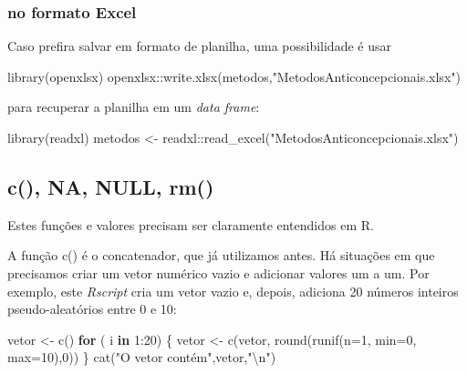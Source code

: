 \documentclass[
]{article}
\newenvironment{Shaded}{\begin{snugshade}}{\end{snugshade}}
\newcommand{\AttributeTok}[1]{\textcolor[rgb]{0.77,0.63,0.00}{#1}}
\newcommand{\ControlFlowTok}[1]{\textcolor[rgb]{0.13,0.29,0.53}{\textbf{#1}}}
\newcommand{\DecValTok}[1]{\textcolor[rgb]{0.00,0.00,0.81}{#1}}
\newcommand{\FunctionTok}[1]{\textcolor[rgb]{0.00,0.00,0.00}{#1}}
\newcommand{\NormalTok}[1]{#1}
\newcommand{\OtherTok}[1]{\textcolor[rgb]{0.56,0.35,0.01}{#1}}
\newcommand{\SpecialCharTok}[1]{\textcolor[rgb]{0.00,0.00,0.00}{#1}}
\newcommand{\StringTok}[1]{\textcolor[rgb]{0.31,0.60,0.02}{#1}}
\begin{document}
\hypertarget{no-formato-excel}{%
\subsubsection{no formato Excel}\label{no-formato-excel}}

Caso prefira salvar em formato de planilha, uma possibilidade é usar

\begin{Shaded}
\begin{Highlighting}[]
\FunctionTok{library}\NormalTok{(openxlsx)}
\NormalTok{openxlsx}\SpecialCharTok{::}\FunctionTok{write.xlsx}\NormalTok{(metodos,}\StringTok{"MetodosAnticoncepcionais.xlsx"}\NormalTok{)}
\end{Highlighting}
\end{Shaded}

para recuperar a planilha em um \emph{data frame}:

\begin{Shaded}
\begin{Highlighting}[]
\FunctionTok{library}\NormalTok{(readxl)}
\NormalTok{metodos }\OtherTok{\textless{}{-}}\NormalTok{ readxl}\SpecialCharTok{::}\FunctionTok{read\_excel}\NormalTok{(}\StringTok{"MetodosAnticoncepcionais.xlsx"}\NormalTok{)}
\end{Highlighting}
\end{Shaded}

\hypertarget{c-na-null-rm}{%
\subsection{c(), NA, NULL, rm()}\label{c-na-null-rm}}

Estes funções e valores precisam ser claramente entendidos em R.

A função c() é o concatenador, que já utilizamos antes. Há situações em
que precisamos criar um vetor numérico vazio e adicionar valores um a
um. Por exemplo, este \emph{Rscript} cria um vetor vazio e, depois,
adiciona 20 números inteiros pseudo-aleatórios entre 0 e 10:

\begin{Shaded}
\begin{Highlighting}[]
\NormalTok{vetor }\OtherTok{\textless{}{-}} \FunctionTok{c}\NormalTok{()}
\ControlFlowTok{for}\NormalTok{ ( i }\ControlFlowTok{in} \DecValTok{1}\SpecialCharTok{:}\DecValTok{20}\NormalTok{)}
\NormalTok{\{}
\NormalTok{  vetor }\OtherTok{\textless{}{-}} \FunctionTok{c}\NormalTok{(vetor, }\FunctionTok{round}\NormalTok{(}\FunctionTok{runif}\NormalTok{(}\AttributeTok{n=}\DecValTok{1}\NormalTok{, }\AttributeTok{min=}\DecValTok{0}\NormalTok{, }\AttributeTok{max=}\DecValTok{10}\NormalTok{),}\DecValTok{0}\NormalTok{))  }
\NormalTok{\}}
\FunctionTok{cat}\NormalTok{(}\StringTok{"O vetor contém"}\NormalTok{,vetor,}\StringTok{"}\SpecialCharTok{\textbackslash{}n}\StringTok{"}\NormalTok{)}
\end{Highlighting}
\end{Shaded}
\end{document}
